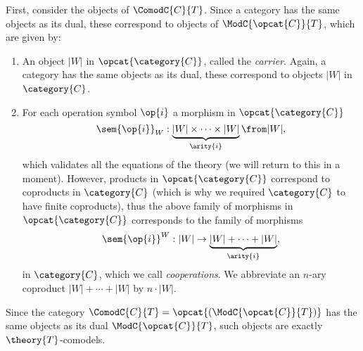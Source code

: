 First, consider the objects of $\ComodC{C}{T}$. Since a category has the same objects as its dual, these correspond to objects of $\ModC{\opcat{C}}{T}$, which are given by:
%
\begin{enumerate}
\item An object $|W|$ in $\opcat{\category{C}}$, called the \emph{carrier}. Again, a category has the same objects as its dual, these correspond to objects $|W|$ in $\category{C}$.
\item For each operation symbol $\op{i}$ a morphism in $\opcat{\category{C}}$
  \begin{equation*}
    \sem{\op{i}}_W : \underbrace{|W| \times \cdots \times |W|}_{\arity{i}} \from |W|,
  \end{equation*}
  which validates all the equations of the theory (we will return to this in a moment). However, products in $\opcat{\category{C}}$ correspond to coproducts in $\category{C}$ (which is why we required $\category{C}$ to have finite coproducts), thus the above family of morphisms in $\opcat{\category{C}}$ corresponds to the family of morphisms
    \begin{equation*}
    \sem{\op{i}}^W : |W| \to \underbrace{|W| + \cdots + |W|}_{\arity{i}},
  \end{equation*}
  in $\category{C}$, which we call \emph{cooperations}. We abbreviate an $n$-ary coproduct $|W| + \cdots + |W|$ by $n \cdot |W|$.
\end{enumerate}
Since the category $\ComodC{C}{T} = \opcat{(\ModC{\opcat{C}}{T})}$ has the same objects as its dual $\ModC{\opcat{C}}{T}$, such objects are exactly $\theory{T}$-comodels.

